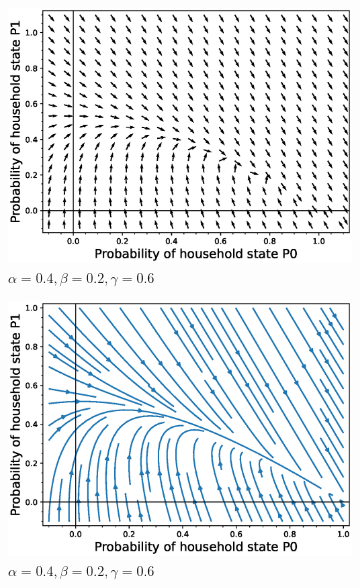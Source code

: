 \documentclass[paper=a4, fontsize=11pt, twoside, BCOR=12mm, parskip=full, listof=totoc]{scrreprt}
\begin{document}
{\begin{figure}[H]
\begin{subfigure}[b]{0.4\linewidth}
		\includegraphics[width=\linewidth]{phase_portrait/043_a3.eps}
		\caption{\(\alpha=0.4, \beta=0.2, \gamma=0.6\)}
		\label{gamma six phasevectorfield}
	\end{subfigure}
	\begin{subfigure}[b]{0.4\linewidth}
		\includegraphics[width=\linewidth]{phase_portrait/043_a3s.eps}
		\caption{\(\alpha=0.4, \beta=0.2, \gamma=0.6\)}
		\label{gamma six phasestreamplot}
	\end{subfigure}
	\begin{subfigure}[b]{0.4\linewidth}

\end{subfigure}
\end{figure}}
\end{document}
